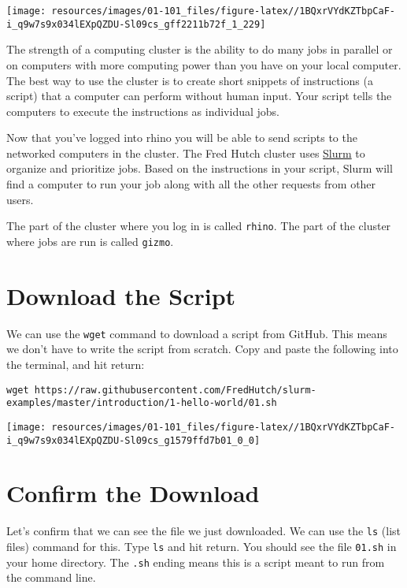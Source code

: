 \documentclass[
]{book}
\begin{document}
\begin{center}\texttt{[image: resources/images/01-101\_files/figure-latex//1BQxrVYdKZTbpCaF-i\_q9w7s9x034lEXpQZDU-Sl09cs\_gff2211b72f\_1\_229]} \end{center}

The strength of a computing cluster is the ability to do many jobs in parallel or on computers with more computing power than you have on your local computer. The best way to use the cluster is to create short snippets of instructions (a script) that a computer can perform without human input. Your script tells the computers to execute the instructions as individual jobs.

Now that you've logged into rhino you will be able to send scripts to the networked computers in the cluster. The Fred Hutch cluster uses \href{https://slurm.schedmd.com/overview.html}{Slurm} to organize and prioritize jobs. Based on the instructions in your script, Slurm will find a computer to run your job along with all the other requests from other users.

The part of the cluster where you log in is called \texttt{rhino}. The part of the cluster where jobs are run is called \texttt{gizmo}.

\hypertarget{download-the-script}{%
\section{Download the Script}\label{download-the-script}}

We can use the \texttt{wget} command to download a script from GitHub. This means we don't have to write the script from scratch. Copy and paste the following into the terminal, and hit return:

\begin{verbatim}
wget https://raw.githubusercontent.com/FredHutch/slurm-examples/master/introduction/1-hello-world/01.sh
\end{verbatim}

\texttt{[image: resources/images/01-101\_files/figure-latex//1BQxrVYdKZTbpCaF-i\_q9w7s9x034lEXpQZDU-Sl09cs\_g1579ffd7b01\_0\_0]}

\hypertarget{confirm-the-download}{%
\section{Confirm the Download}\label{confirm-the-download}}

Let's confirm that we can see the file we just downloaded. We can use the \texttt{ls} (list files) command for this. Type \texttt{ls} and hit return. You should see the file \texttt{01.sh} in your home directory. The \texttt{.sh} ending means this is a script meant to run from the command line.
\end{document}
